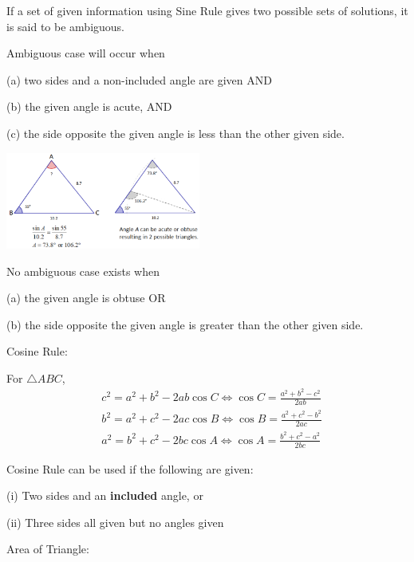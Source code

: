 \documentclass[twocolumn]{article}
\begin{document}
\bigskip 

\noindent
If a set of given information using Sine Rule gives two possible sets of solutions, it is said to be ambiguous.

\bigskip 

\noindent
Ambiguous case will occur when

\noindent
(a) two sides and a non-included angle are given AND

\noindent
(b) the given angle is acute, AND

\noindent
(c) the side opposite the given angle is less than the other given side.

\includegraphics[width=0.48\textwidth]{104.png}

\bigskip 

\noindent
No ambiguous case exists when

\noindent
(a) the given angle is obtuse OR

\noindent
(b) the side opposite the given angle is greater than the other given side.

\bigskip 

\noindent 
Cosine Rule:

\bigskip 

\noindent 
For $\triangle A B C$,
$$
\begin{aligned}
	& c^2=a^2+b^2-2 a b \cos C \Leftrightarrow \cos C=\frac{a^2+b^2-c^2}{2 a b} \\
	& b^2=a^2+c^2-2 a c \cos B \Leftrightarrow \cos B=\frac{a^2+c^2-b^2}{2 a c} \\
	& a^2=b^2+c^2-2 b c \cos A \Leftrightarrow \cos A=\frac{b^2+c^2-a^2}{2 b c}
\end{aligned}
$$

\bigskip 

\noindent 
Cosine Rule can be used if the following are given:

\noindent 
(i) Two sides and an {\bf included} angle, or

\noindent 
(ii) Three sides all given but no angles given

\bigskip 

\noindent 
Area of Triangle:

\bigskip 
\end{document}
